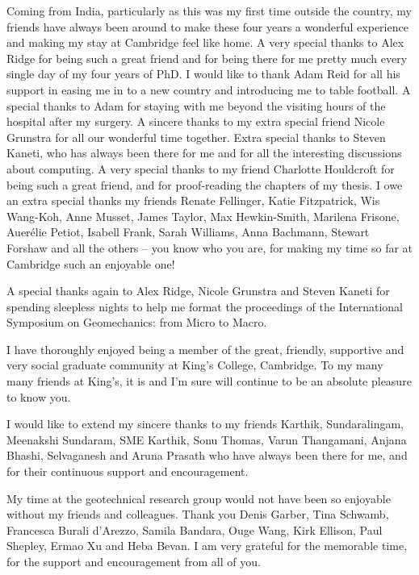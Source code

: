 \begin{acknowledgements}
Coming from India, particularly as this was my first time outside the country, 
my friends have always been around to make these four years a wonderful 
experience and making my stay at Cambridge feel like home. A very special 
thanks to Alex Ridge for being such a great friend 
and for being there for me pretty much every single day of my four years of 
PhD. I would like to thank Adam Reid for all his support in easing me in to a 
new country and introducing me to table football. A special thanks to Adam for 
staying with me beyond the visiting hours of the hospital after my surgery. A 
sincere thanks to my extra special friend Nicole Grunstra for all our 
wonderful time together. Extra special thanks to Steven Kaneti, who has always 
been there for me and for all the interesting discussions about computing. A 
very special thanks to my friend Charlotte Houldcroft for being such a great 
friend, and for proof-reading the chapters of my thesis. I owe 
an extra special 
thanks my friends Renate Fellinger, Katie Fitzpatrick, Wis Wang-Koh, Anne 
Musset, James Taylor, Max Hewkin-Smith, Marilena Frisone, Auer\'{e}lie Petiot, 
Isabell Frank, Sarah Williams, Anna Bachmann, Stewart Forshaw and all the 
others -- you know who you are, for making my time so far at Cambridge such an 
enjoyable one!

A special thanks again to Alex Ridge, Nicole Grunstra and Steven Kaneti for 
spending sleepless nights to help me format the proceedings of the 
International Symposium on Geomechanics: from Micro to Macro.

I have thoroughly enjoyed being a member of the great, friendly, supportive and 
very social graduate community at King's College, Cambridge. To my many many 
friends at King's, it is and I'm sure will continue to be an absolute pleasure 
to know you. %

I would like to extend my sincere thanks to my friends Karthik, Sundaralingam, 
Meenakshi Sundaram, SME Karthik, Sonu Thomas, Varun Thangamani, Anjana Bhashi,  
Selvaganesh and Aruna Prasath who have always been there for me, and for their 
continuous support and encouragement. 

My time at the geotechnical research group would not have been so enjoyable 
without my friends and colleagues. Thank you Denis Garber, Tina Schwamb, 
Francesca Burali d'Arezzo, Samila Bandara, Ouge Wang, Kirk Ellison, Paul 
Shepley, Ermao Xu and Heba Bevan. I am very grateful for the memorable time, 
for the support and encouragement from all of you. 


\end{acknowledgements}
